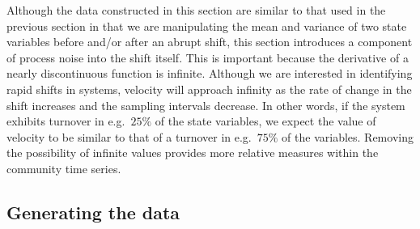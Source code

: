 \documentclass[print]{nuthesis}
\begin{document}
Although the data constructed in this section are similar to that used in the previous section in that we are manipulating the mean and variance of two state variables before and/or after an abrupt shift, this section introduces a component of process noise into the shift itself. This is important because the derivative of a nearly discontinuous function is infinite. Although we are interested in identifying rapid shifts in systems, velocity will approach infinity as the rate of change in the shift increases and the sampling intervals decrease. In other words, if the system exhibits turnover in e.g.~\(25\%\) of the state variables, we expect the value of velocity to be similar to that of a turnover in e.g.~\(75\%\) of the variables. Removing the possibility of infinite values provides more relative measures within the community time series.

\hypertarget{generating-the-data}{%
\subsection{Generating the data}\label{generating-the-data}}
\end{document}

